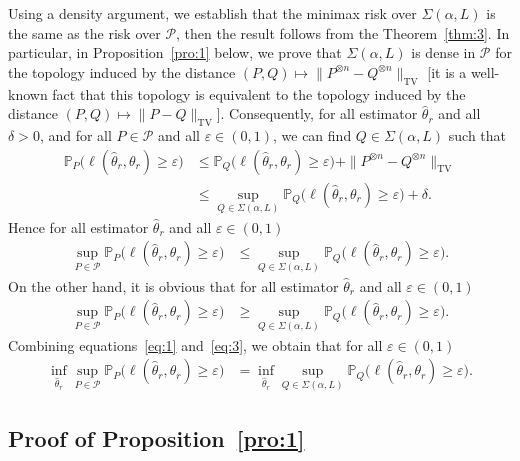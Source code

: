 \documentclass{article}
\newcommand{\1}{\boldsymbol{1}}
\newcommand{\PP}{\mathbb{P}}
\theoremstyle{plain}
\begin{document}
Using a density argument, we establish that the minimax risk over $\Sigma(\alpha,L)$ is the same as the risk over $\mathcal{P}$, then the result follows from the Theorem~\ref{thm:3}. In particular, in Proposition~\ref{pro:1} below, we prove that $\Sigma(\alpha,L)$ is dense in $\mathcal{P}$ for the topology induced by the distance $(P,Q) \mapsto \|P^{\otimes n} - Q^{\otimes n}\|_{\mathrm{TV}}$ [it is a well-known fact that this topology is equivalent to the topology induced by the distance $(P,Q) \mapsto \|P - Q\|_{\mathrm{TV}}$]. Consequently, for all estimator $\hat{\theta}_r$ and all $\delta > 0$, and for all $P\in \mathcal{P}$ and all $\varepsilon \in (0,1)$, we can find $Q \in \Sigma(\alpha,L)$ such that
\begin{align*}
  \PP_P\big( \ell(\hat{\theta}_r,\theta_r) \geq \varepsilon \big)%
  &\leq \PP_Q\big( \ell(\hat{\theta}_r,\theta_r) \geq \varepsilon \big)%
    + \|P^{\otimes n} - Q^{\otimes n}\|_{\mathrm{TV}}\\
  &\leq \sup_{Q\in \Sigma(\alpha,L)}\PP_Q\big( \ell(\hat{\theta}_r,\theta_r) \geq \varepsilon \big)%
    + \delta.
\end{align*}
Hence for all estimator $\hat{\theta}_r$ and all $\varepsilon \in (0,1)$
\begin{align}
  \label{eq:1}
  \sup_{P\in \mathcal{P}}\PP_P\big( \ell(\hat{\theta}_r,\theta_r) \geq \varepsilon \big)%
  &\leq \sup_{Q\in \Sigma(\alpha,L)}\PP_Q\big( \ell(\hat{\theta}_r,\theta_r) \geq \varepsilon \big).
\end{align}
On the other hand, it is obvious that for all estimator $\hat{\theta}_r$ and all $\varepsilon \in (0,1)$
\begin{align}
  \label{eq:3}
  \sup_{P\in \mathcal{P}}\PP_P\big( \ell(\hat{\theta}_r,\theta_r) \geq \varepsilon \big)%
  &\geq \sup_{Q\in \Sigma(\alpha,L)}\PP_Q\big( \ell(\hat{\theta}_r,\theta_r) \geq \varepsilon \big).
\end{align}
Combining equations~\eqref{eq:1} and~\eqref{eq:3}, we obtain that for all $\varepsilon \in (0,1)$
\begin{align*}
  \inf_{\hat{\theta}_r}\sup_{P\in \mathcal{P}} \PP_P\big( \ell(\hat{\theta}_r,\theta_r) \geq \varepsilon \big)%
  &= \inf_{\hat{\theta}_r}\sup_{Q\in \Sigma(\alpha,L)} \PP_Q\big( \ell(\hat{\theta}_r,\theta_r) \geq \varepsilon \big).
\end{align*}

\subsection{Proof of Proposition~\ref{pro:1}}
\label{sec:proof-prop-refpr-1}
\end{document}
